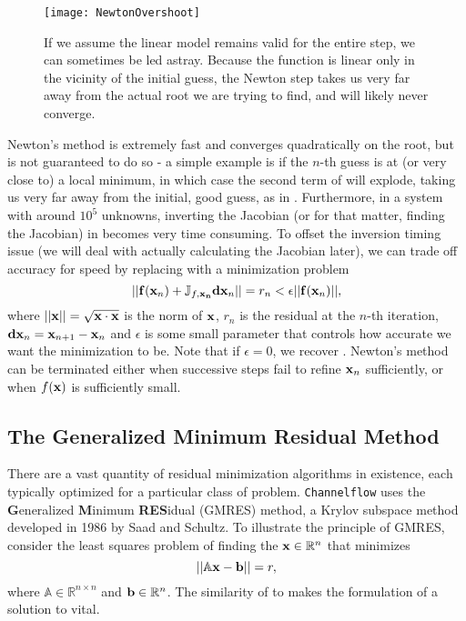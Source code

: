   \begin{figure}[h]
 \texttt{[image: NewtonOvershoot]}
 \caption{If we assume the linear model remains valid for the entire step, we can sometimes be led astray. Because the function is linear only in the vicinity of the initial guess, the Newton step takes us very far away from the actual root we are trying to find, and will likely never converge.}\label{fig:NewtonOvershoot}
 \end{figure}
 
Newton's method is extremely fast and converges quadratically on the root, but is not guaranteed to do so - a simple example is if the $n$-th guess is at (or very close to) a local minimum, in which case the second term of  will explode, taking us very far away from the initial, good guess, as in . Furthermore, in a system with around $10^5$ unknowns, inverting the Jacobian (or for that matter, finding the Jacobian) in  becomes very time consuming. To offset the inversion timing issue (we will deal with actually calculating the Jacobian later), we can trade off accuracy for speed by replacing    with a minimization problem
\begin{equation}\label{eq:minimizeNewt}
||\mathbf{f}(\mathbf{x}_n) + \mathbb{J}_{f,\mathbf{x_n}}\mathbf{dx}_n|| = r_n< \epsilon ||\mathbf{f}(\mathbf{x}_n)||,
\end{equation}
where $||\mathbf{x}|| = \sqrt{\mathbf{x} \cdot \mathbf{x}}$ is the norm of $\mathbf{x}$, $r_n$ is the residual at the $n$-th iteration, $\mathbf{dx}_n = \mathbf{x}_{n+1} - \mathbf{x}_n$ and $\epsilon$ is some small parameter that controls how accurate we want the minimization to be. Note that if $\epsilon = 0$, we recover . Newton's method can be terminated either when successive steps fail to refine $\mathbf{x}_n$ sufficiently, or when $f(\mathbf{x})$ is sufficiently small.

\subsection{The Generalized Minimum Residual Method}

There are a vast quantity of residual minimization algorithms in existence, each typically optimized for a particular class of problem. {\tt Channelflow} uses the {\bf G}eneralized {\bf M}inimum {\bf RES}idual (GMRES) method, a Krylov subspace method developed in 1986 by Saad and Schultz. To illustrate the principle of GMRES, consider the least squares problem of finding the $\mathbf{x} \in \mathbb{R}^n$ that minimizes
\begin{equation}\label{eq:AXB}
||\mathbb{A}\mathbf{x} -\mathbf{b}|| = r,
\end{equation}
where $\mathbb{A} \in \mathbb{R}^{n\times n}$ and $\mathbf{b} \in \mathbb{R}^n$. The similarity of  to  makes the formulation of a solution to  vital. 
